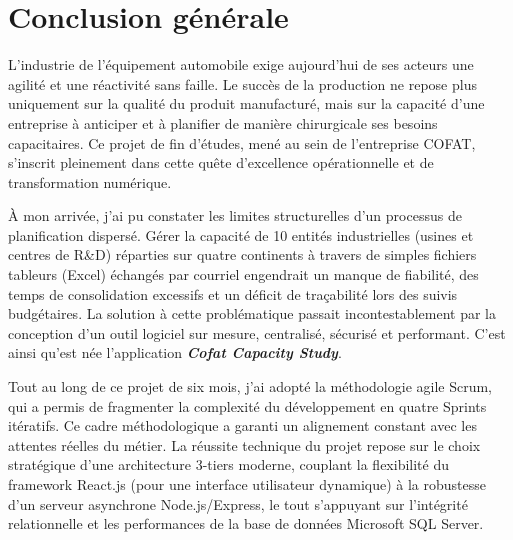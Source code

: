 \chapter*{Conclusion générale}

L'industrie de l'équipement automobile exige aujourd'hui de ses acteurs une agilité et une réactivité sans faille. Le succès de la production ne repose plus uniquement sur la qualité du produit manufacturé, mais sur la capacité d'une entreprise à anticiper et à planifier de manière chirurgicale ses besoins capacitaires. Ce projet de fin d'études, mené au sein de l'entreprise COFAT, s'inscrit pleinement dans cette quête d'excellence opérationnelle et de transformation numérique. 

À mon arrivée, j'ai pu constater les limites structurelles d'un processus de planification dispersé. Gérer la capacité de 10 entités industrielles (usines et centres de R\&D) réparties sur quatre continents à travers de simples fichiers tableurs (Excel) échangés par courriel engendrait un manque de fiabilité, des temps de consolidation excessifs et un déficit de traçabilité lors des suivis budgétaires. La solution à cette problématique passait incontestablement par la conception d'un outil logiciel sur mesure, centralisé, sécurisé et performant. C'est ainsi qu'est née l'application \textbf{\textit{Cofat Capacity Study}}.

Tout au long de ce projet de six mois, j'ai adopté la méthodologie agile Scrum, qui a permis de fragmenter la complexité du développement en quatre Sprints itératifs. Ce cadre méthodologique a garanti un alignement constant avec les attentes réelles du métier. La réussite technique du projet repose sur le choix stratégique d'une architecture 3-tiers moderne, couplant la flexibilité du framework React.js (pour une interface utilisateur dynamique) à la robustesse d'un serveur asynchrone Node.js/Express, le tout s'appuyant sur l'intégrité relationnelle et les performances de la base de données Microsoft SQL Server.

